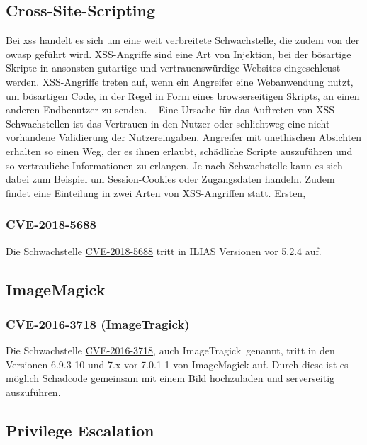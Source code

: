 \documentclass[10pt, a4paper,onecolumn ,titlepage]{article}
\begin{document}
    \subsection{Cross-Site-Scripting}
    \label{subsec:CrossSiteScripting}
    Bei \ac{xss} handelt es sich um eine weit verbreitete Schwachstelle, die zudem von der \ac{owasp} geführt wird.
    XSS-Angriffe sind eine Art von Injektion, bei der bösartige Skripte in ansonsten gutartige und vertrauenswürdige Websites eingeschleust werden.
    XSS-Angriffe treten auf, wenn ein Angreifer eine Webanwendung nutzt, um bösartigen Code, in der Regel in Form eines browserseitigen Skripts, an einen anderen Endbenutzer zu senden. ~\textcite{RN1}
    Eine Ursache für das Auftreten von XSS-Schwachstellen ist das Vertrauen in den Nutzer oder schlichtweg eine nicht vorhandene Validierung der Nutzereingaben.
    Angreifer mit unethischen Absichten erhalten so einen Weg, der es ihnen erlaubt, schädliche Scripte auszuführen und so vertrauliche Informationen zu erlangen.
    Je nach Schwachstelle kann es sich dabei zum Beispiel um Session-Cookies oder Zugangsdaten handeln.
    Zudem findet eine Einteilung in zwei Arten von XSS-Angriffen statt. Ersten,

    \subsubsection{CVE-2018-5688}
    \label{subsubsec:CVE-2018-5688}
    Die Schwachstelle \href{https://www.cve.org/CVERecord?id=CVE-2018-5688}{CVE-2018-5688} tritt in ILIAS Versionen vor 5.2.4 auf.

    \subsection{ImageMagick}
    \label{subsec:ImageMagick}


    \subsubsection{CVE-2016-3718 (ImageTragick)}
    \label{subsubsec:CVE-2016-3718}
    Die Schwachstelle \href{https://www.cve.org/CVERecord?id=CVE-2016-3718}{CVE-2016-3718}, auch \glqq ImageTragick\grqq\ genannt,
    tritt in den Versionen 6.9.3-10 und 7.x vor 7.0.1-1 von ImageMagick auf. Durch diese ist es möglich Schadcode gemeinsam mit einem Bild hochzuladen
    und serverseitig auszuführen.

    \subsection{Privilege Escalation}
    \label{subsec:PrivilegeEscalation}
\end{document}
